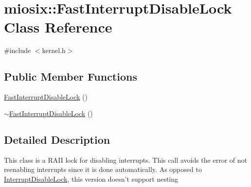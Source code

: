 \hypertarget{classmiosix_1_1_fast_interrupt_disable_lock}{\section{miosix\-:\-:Fast\-Interrupt\-Disable\-Lock Class Reference}
\label{classmiosix_1_1_fast_interrupt_disable_lock}
}


{\ttfamily \#include $<$kernel.\-h$>$}

\subsection*{Public Member Functions}
\begin{DoxyCompactItemize}
\item 
\hyperlink{classmiosix_1_1_fast_interrupt_disable_lock_ac10ca2ad58013504750550337bdaf6cf}{Fast\-Interrupt\-Disable\-Lock} ()
\item 
\hyperlink{classmiosix_1_1_fast_interrupt_disable_lock_aa060c8983f93de1724b51c361de76477}{$\sim$\-Fast\-Interrupt\-Disable\-Lock} ()
\end{DoxyCompactItemize}


\subsection{Detailed Description}
This class is a R\-A\-I\-I lock for disabling interrupts. This call avoids the error of not reenabling interrupts since it is done automatically. As opposed to \hyperlink{classmiosix_1_1_interrupt_disable_lock}{Interrupt\-Disable\-Lock}, this version doesn't support nesting 


